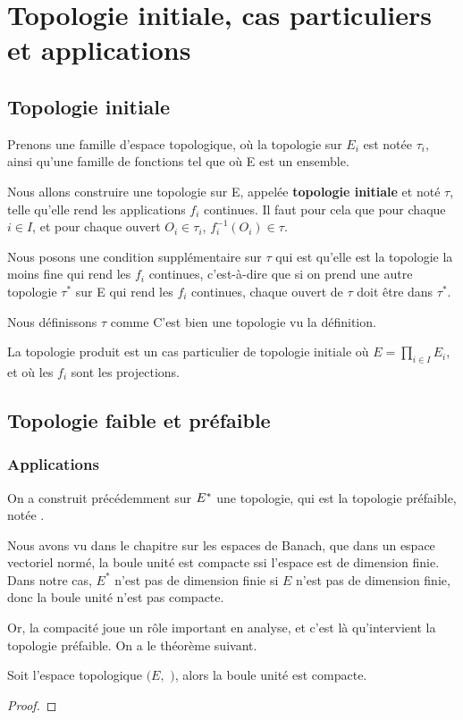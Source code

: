 \section{Topologie initiale, cas particuliers et applications}

\subsection{Topologie initiale}

Prenons une famille
 d'espace topologique, où la topologie sur $E_{i}$ est notée
$\tau_{i}$, ainsi qu'une famille de fonctions  tel que
 où E est un ensemble.

Nous allons construire une topologie sur E, appelée \textbf{topologie initiale}
et noté $\tau$, telle qu'elle rend les applications $f_{i}$ continues. Il faut pour cela que
pour chaque $i \in I$, et pour chaque ouvert $O_{i} \in \tau_{i}$,
$f_{i}^{-1}(O_{i}) \in \tau$.

Nous posons une condition supplémentaire sur $\tau$ qui est qu'elle est la
topologie la moins fine qui rend les $f_{i}$ continues, c'est-à-dire que si on
prend une autre topologie $\tau^{*}$ sur E qui rend les $f_{i}$ continues, chaque
ouvert de $\tau$ doit être dans $\tau^{*}$.

Nous définissons $\tau$ comme %
C'est bien une topologie vu la définition.

\begin{exemple}
	La topologie produit est un cas particulier de topologie initiale où $E =
	\displaystyle \prod_{i \in I} E_{i}$, et où les $f_{i}$ sont les projections.
\end{exemple}

\subsection{Topologie faible et préfaible}

\subsubsection{Applications}

On a construit précédemment sur $E^{*}$ une topologie, qui est la topologie
préfaible, notée .

Nous avons vu dans le chapitre sur les espaces de Banach, que dans un espace
vectoriel normé, la boule unité est compacte ssi l'espace est de dimension
finie. Dans notre cas, $E^{*}$ n'est pas de dimension finie si $E$ n'est pas de
dimension finie, donc la boule unité n'est pas compacte.

Or, la compacité joue un rôle important en analyse, et c'est là qu'intervient la topologie préfaible. On a le théorème suivant.

\begin{theorem}
	Soit l'espace topologique $(E,$ $)$, alors la boule unité
	est compacte.
\end{theorem}

\begin{proof}
	
\end{proof}
